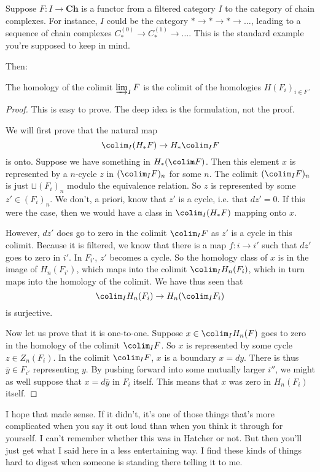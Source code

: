 
Suppose $F: I \to \mathbf{Ch}$ is a functor from a filtered category $I$ to the
category of chain complexes. For instance, $I$ could be the category $\ast \to
\ast \to \ast \to \dots$, leading to  a sequence of chain complexes
$C_*^{(0)}\to C_{*}^{(1)} \to \dots$.  This is the standard example you're
supposed to keep in mind. 

Then:
\begin{proposition} 
The homology of the colimit $\varinjlim_I F$ is the colimit of the homologies
$H(F_i)_{i \in F}$.
\end{proposition} 

\begin{proof} 
This is easy to prove. The deep idea is the formulation, not the proof. 

We will first prove that the  natural map
\[ \colim_I (H_*F) \to H_* \colim_I F   \]
is onto. Suppose we have something in $H_*(\colim F)$. Then this element $x$ is
represented by a $n$-cycle $z$ in $(\colim_I F)_n$ for some $n$. The colimit
$(\colim_I F)_n$ is just $\sqcup (F_i)_n$ modulo the equivalence relation. 
So $z$ is represented by some $z' \in (F_i)_n$. We don't, a priori, know that
$z'$ is a cycle, i.e. that $dz' = 0$. If this were the case, then we would have
a class in $\colim_I (H_* F)$ mapping onto $x$.

However, $dz'$ does go to zero in the colimit $\colim_I F$ as $z'$ is a cycle
in this colimit. Because it is filtered, we know that there is a map $f:i \to
i'$ such that $dz'$ goes to zero in $i'$. 
In $F_{i'}$, $z'$ becomes a cycle.  So the homology class of $x$ is in the
image of $H_n(F_{i'})$, which maps into the colimit $\colim_I H_n(F_i)$, which
in turn maps into the homology of the colimit. We have thus seen that
\[ \colim_I H_n(F_i) \to H_n(\colim_I F_i)  \]
is surjective. 

Now let us prove that it is one-to-one. Suppose $x \in \colim_I H_n(F)$ 
goes to zero in the homology of the colimit $\colim_I F$. So $x$ is represented
by some cycle $z \in Z_n(F_i)$.  In the colimit $\colim_I F$, $x$ is a
boundary $x = dy$. There is thus $\overline{y} \in F_{i'}$ representing $y$. 
By pushing forward into some mutually larger $i''$, we might as well suppose that $x = d
\overline{y}$ in
$F_i$ itself. This means that $x$ was zero in $H_n(F_i)$ itself.
\end{proof} 

I hope that made sense. If it didn't, it's one of those things that's more
complicated when you say it out loud than when you think it through for
yourself. I can't remember whether this was in Hatcher or not.
But then you'll just get what I said here in a less entertaining way. I find
these kinds of things hard to digest when someone is standing there telling it
to me. 


